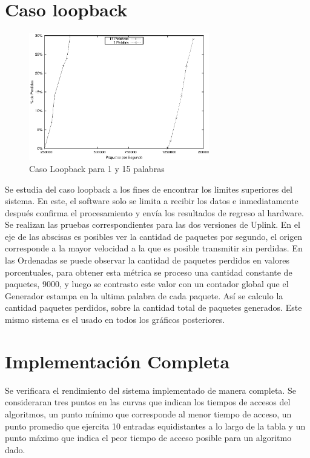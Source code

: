 \newpage
\section{Caso loopback}
\begin{figure}[h]
  \centering
	\includegraphics[width=0.70\textwidth]{5-resultados/graf/loop.eps}
  \caption{Caso Loopback para 1 y 15 palabras}
  \label{fig}
\end{figure}
Se estudia del caso loopback a los fines de encontrar los limites superiores del sistema. En este, el software solo se limita a recibir los datos e inmediatamente después confirma el procesamiento y envía los resultados de regreso al hardware. Se realizan las pruebas correspondientes para las dos versiones de Uplink.
En el eje de las abscisas es posibles ver la cantidad de paquetes por segundo, el origen corresponde a la mayor velocidad a la que es posible transmitir sin perdidas. En las Ordenadas se puede observar la cantidad de paquetes perdidos en valores porcentuales, para obtener esta métrica se proceso una cantidad constante de paquetes, 9000, y luego se contrasto este valor con un contador global que el Generador estampa en la ultima palabra de cada paquete. Así se calculo la cantidad paquetes perdidos, sobre la cantidad total de paquetes generados. Este mismo sistema es el usado en todos los gráficos posteriores.


\newpage
\section{Implementación Completa}

Se verificara el rendimiento del sistema implementado de manera completa. Se consideraran tres puntos en las curvas que indican los tiempos de accesos del algoritmos, un punto mínimo que corresponde al menor tiempo de acceso, un punto promedio que ejercita 10 entradas equidistantes a lo largo de la tabla y un punto máximo que indica el peor tiempo de acceso posible para un algoritmo dado. 


